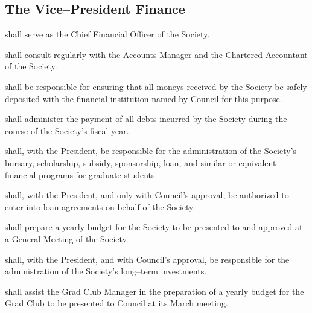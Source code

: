 \subsection {The Vice--President Finance} 
\begin{longenum}[ label*=\thesubsection.\arabic*., align=left]
	\item shall serve as the Chief Financial Officer of the Society.
    \item shall consult regularly with the Accounts Manager and the Chartered Accountant of the Society.
    \item shall be responsible for ensuring that all moneys received by the Society be safely deposited with the financial institution named by Council for this purpose.
    \item shall administer the payment of all debts incurred by the Society during the course of the Society's fiscal year.
    \item shall, with the President, be responsible for the administration of the Society's bursary, scholarship, subsidy, sponsorship, loan, and similar or equivalent financial programs for graduate students.
    \item shall, with the President, and only with Council's approval, be authorized to enter into loan agreements on behalf of the Society. 
    \item shall prepare a yearly budget for the Society to be presented to and approved at a General Meeting of the Society.
    \item shall, with the President, and with Council's approval, be responsible for the administration of the Society's long--term investments.
    \item shall assist the Grad Club Manager in the preparation of a yearly budget for the Grad Club to be presented to Council at its March meeting. 

\end{longenum}
